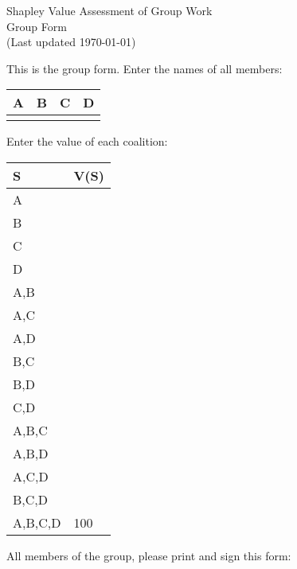\documentclass[12pt]{article}
\begin{document}
\begin{center}
\Large{Shapley Value Assessment of Group Work}\\
Group Form\\
\tiny{(Last updated \today)}
\end{center}

This is the group form. Enter the names of all members:
\vspace{1cm}

\begin{center}
\begin{tabular}{p{3cm}|p{3cm}|p{3cm}|p{3cm}}
A&B&C&D\\
\hline
&&&
\end{tabular}
\end{center}
\vspace{1cm}

Enter the value of each coalition:
\vspace{.5cm}

\begin{center}
\begin{tabular}{l|p{2cm}}
S&V(S)\\\hline
A&\\\hline
B&\\\hline
C&\\\hline
D&\\\hline
A,B&\\\hline
A,C&\\\hline
A,D&\\\hline
B,C&\\\hline
B,D&\\\hline
C,D&\\\hline
A,B,C&\\\hline
A,B,D&\\\hline
A,C,D&\\\hline
B,C,D&\\\hline
A,B,C,D&100\\\hline
\end{tabular}
\end{center}

\vspace{.5cm}

All members of the group, please print and sign this form:
\end{document}

